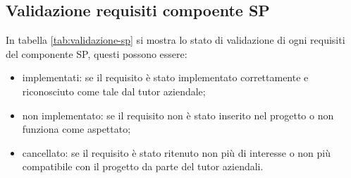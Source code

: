\subsection{Validazione requisiti compoente SP}
In tabella \ref{tab:validazione-sp} si mostra lo stato di validazione di ogni requisiti del componente SP, questi possono essere:
\begin{itemize}
    \item implementati: se il requisito è stato implementato correttamente e riconosciuto come tale dal tutor aziendale;
    \item non implementato: se il requisito non è stato inserito nel progetto o non funziona come aspettato;
    \item cancellato: se il requisito è stato ritenuto non più di interesse o non più compatibile con il progetto da parte del tutor aziendali.
\end{itemize}
